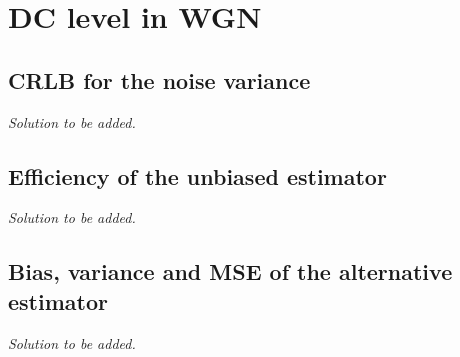 \section{DC level in WGN}

\subsection{CRLB for the noise variance}

\emph{Solution to be added.}

\subsection{Efficiency of the unbiased estimator}

\emph{Solution to be added.}

\subsection{Bias, variance and MSE of the alternative estimator}

\emph{Solution to be added.}
